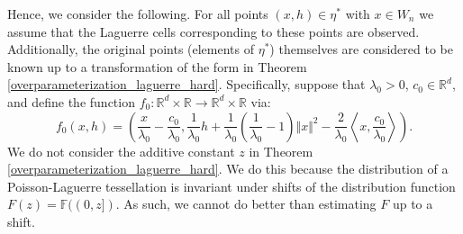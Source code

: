 \documentclass{article}
\newcommand{\RR}{\mathbb{R}}
\theoremstyle{plain}
\theoremstyle{remark}
\theoremstyle{definition}
\begin{document}
Hence, we consider the following. For all points $(x,h) \in \eta^*$ with $x \in W_n$ we assume that the Laguerre cells corresponding to these points are observed. Additionally, the original points (elements of $\eta^*$) themselves are considered to be known up to a transformation of the form in Theorem \ref{overparameterization_laguerre_hard}. Specifically, suppose that $\lambda_0 > 0$, $c_0 \in \RR^d$, and define the function $f_0:\RR^d \times \RR \to \RR^d \times \RR$ via:
\[f_0(x,h) = \left(\frac{x}{\lambda_0} - \frac{c_0}{\lambda_0}, \frac{1}{\lambda_0} h + \frac{1}{\lambda_0}\left(\frac{1}{\lambda_0} - 1\right)\Vert x \Vert^2 - \frac{2}{\lambda_0}\left\langle x,\frac{c_0}{\lambda_0} \right\rangle \right).\]
We do not consider the additive constant $z$ in Theorem \ref{overparameterization_laguerre_hard}. We do this because the distribution of a Poisson-Laguerre tessellation is invariant under shifts of the distribution function $F(z) =\mathbb{F}((0,z])$. As such, we cannot do better than estimating $F$ up to a shift.
\end{document}
